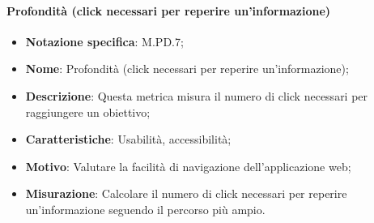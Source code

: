\paragraph*{Profondità (click necessari per reperire un'informazione)}
\begin{itemize}
    \item \textbf{Notazione specifica}: M.PD.7;
    \item \textbf{Nome}: Profondità (click necessari per reperire un'informazione);
    \item \textbf{Descrizione}: Questa metrica misura il numero di click necessari per raggiungere un obiettivo;
    \item \textbf{Caratteristiche}: Usabilità, accessibilità;
    \item \textbf{Motivo}: Valutare la facilità di navigazione dell'applicazione web;
    \item \textbf{Misurazione}: Calcolare il numero di click necessari per reperire un'informazione seguendo il percorso più ampio.
\end{itemize}
